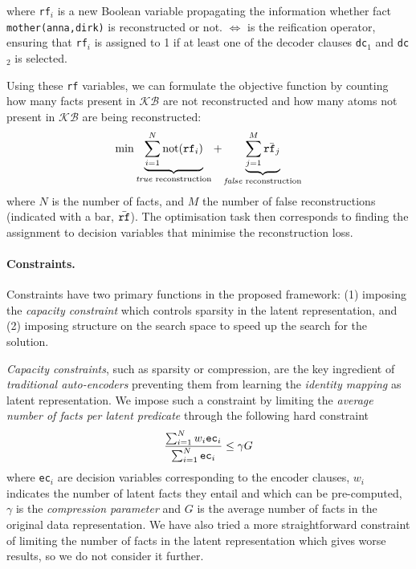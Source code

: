 where \texttt{rf}$_i$ is a new Boolean variable propagating the information whether fact \texttt{mother(anna,dirk)} is reconstructed or not.
$\Leftrightarrow$ is the reification operator, ensuring that \texttt{rf}$_i$ is assigned to 1 if at least one of the decoder clauses \texttt{dc}$_1$ and \texttt{dc}$_2$ is selected.

Using these \texttt{rf} variables, we can formulate the objective function by counting how many facts present in $\mathcal{KB}$ are not reconstructed and how many atoms not present in $\mathcal{KB}$ are being reconstructed:
\begin{equation}
	\min \underbrace{\sum_{i=1}^{N}\text{not}(\text{\texttt{rf}}_i)}_{\text{\textit{true} reconstruction}} +  \underbrace{\sum_{j=1}^{M} \bar{\text{\texttt{rf}}_j}}_{\text{\textit{false} reconstruction}}
\end{equation}
where $N$ is the number of facts, and $M$ the number of false reconstructions (indicated with a bar, $\bar{\text{\texttt{rf}}}$). %
The optimisation task then corresponds to finding the assignment to decision variables that minimise the reconstruction loss.



\paragraph{Constraints.}
Constraints have two primary functions in the proposed framework: (1) imposing the \textit{capacity constraint} which controls sparsity in the latent representation, and (2) imposing structure on the search space to speed up the search for the solution.


\textit{Capacity constraints}, such as sparsity or compression, are the key ingredient of \textit{traditional auto-encoders} preventing them from learning the \textit{identity mapping} as latent representation.
We impose such a constraint by limiting the \textit{average number of facts per latent predicate} through the following hard constraint
$$ \frac{\sum_{i=1}^{N}w_i\text{\texttt{ec}}_i}{\sum_{i=1}^N\text{\texttt{ec}}_i} \leq \gamma G$$
where \texttt{ec}$_i$ are decision variables corresponding to the encoder clauses, $w_i$ indicates the number of latent facts they entail and which can be pre-computed, $\gamma$ is the \textit{compression parameter} and $G$ is the average number of facts in the original data representation.
We have also tried a more straightforward constraint of limiting the number of facts in the latent representation which gives worse results, so we do not consider it further.


